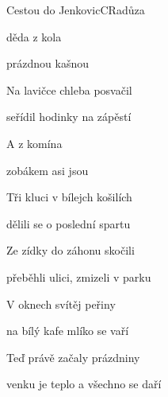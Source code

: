 \begin{song}{Cestou do Jenkovic}{C}{Radůza}

\begin{SBVerse}

 děda z kola 

 prázdnou kašnou 

Na lavičce chleba posvačil

seřídil hodinky na zápěstí

\end{SBVerse}

\begin{SBChorus}

A  z komína 

zobákem  asi jsou 

\end{SBChorus}

\begin{SBVerse}

Tři kluci v bílejch košilích

dělili se o poslední spartu

Ze zídky do záhonu skočili

přeběhli ulici, zmizeli v parku

\end{SBVerse}

\begin{SBChorus}

\end{SBChorus}

\begin{SBVerse}

V oknech svítěj peřiny

na bílý kafe mlíko se vaří

Teď právě začaly prázdniny

venku je teplo a všechno se daří

\end{SBVerse}

\begin{SBChorus}

\end{SBChorus}

\end{song}

\clearpage
